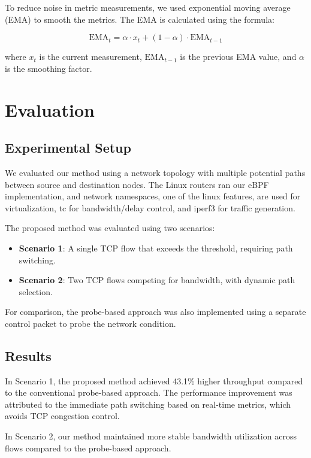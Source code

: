 \documentclass[conference]{IEEEtran}
\begin{document}
To reduce noise in metric measurements, we used exponential moving average (EMA) to smooth the metrics.
The EMA is calculated using the formula:

\begin{equation}
  \text{EMA}_t = \alpha \cdot x_t + (1 - \alpha) \cdot \text{EMA}_{t-1}
\end{equation}

where \(x_t\) is the current measurement, \(\text{EMA}_{t-1}\) is the previous EMA value, and \(\alpha\) is the smoothing factor.

\section{Evaluation}
\subsection{Experimental Setup}

We evaluated our method using a network topology with multiple potential paths between source and destination nodes. The Linux routers ran our eBPF implementation, and network namespaces, one of the linux features, are used for virtualization, tc for bandwidth/delay control, and iperf3 for traffic generation.

The proposed method was evaluated using two scenarios:

\begin{itemize}
  \item \textbf{Scenario 1}: A single TCP flow that exceeds the threshold, requiring path switching.
  \item \textbf{Scenario 2}: Two TCP flows competing for bandwidth, with dynamic path selection.
\end{itemize}

For comparison, the probe-based approach was also implemented using a separate control packet to probe the network condition.

\subsection{Results}

In Scenario 1, the proposed method achieved 43.1\% higher throughput compared to the conventional probe-based approach.
The performance improvement was attributed to the immediate path switching based on real-time metrics, which avoids TCP congestion control.

In Scenario 2, our method maintained more stable bandwidth utilization across flows compared to the probe-based approach.
\end{document}
